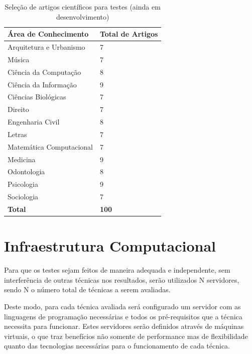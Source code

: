 \begin{table}
    \caption{Seleção de artigos científicos para testes (ainda em desenvolvimento)}
    \begin{center}
        \begin{tabular}{|l|l|}
        	\hline
            \textbf{Área de Conhecimento} & \textbf{Total de Artigos} \\ 
            \hline
            Arquitetura e Urbanismo & 7 \\ 
			Música & 7 \\ 
			Ciência da Computação & 8 \\
			Ciência da Informação & 9 \\
            Ciências Biológicas & 7 \\
            Direito & 7 \\
            Engenharia Civil & 8 \\
            Letras & 7 \\
            Matemática Computacional & 7 \\
            Medicina & 9 \\ 
            Odontologia & 8 \\ 
            Psicologia & 9 \\
            Sociologia & 7 \\	
            \hline
            \textbf{Total} & \textbf{100} \\
            \hline 
        \end{tabular}
    \end{center}
    \label{tab:papers-list}
\end{table}

\section{Infraestrutura Computacional}

Para que os testes sejam feitos de maneira adequada e independente, sem interferência de outras técnicas nos resultados, serão utilizados N servidores, sendo N o número total de técnicas a serem avaliadas.

Deste modo, para cada técnica avaliada será configurado um servidor com as linguagens de programação necessárias e todos os pré-requisitos que a técnica necessita para funcionar. Estes servidores serão definidos através de máquinas virtuais, o que traz benefícios não somente de performance mas de flexibilidade quanto das tecnologias necessárias para o funcionamento de cada técnica.

